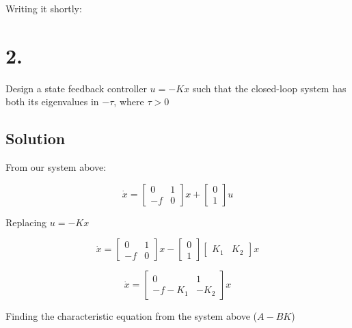 \documentclass[10pt,a4paper]{article}
\begin{document}
Writing it shortly:
\begin{center}
\medskip

\end{center}

\section*{2.}
Design a state feedback controller $u = -Kx$ such that the closed-loop system has both its eigenvalues in $-\tau$, where $\tau > 0$

\subsection*{Solution}
From our system above:

\[
\dot{x} =
\begin{bmatrix}
0 & 1 \\
-f & 0
\end{bmatrix}
x
+
\begin{bmatrix}
0 \\
1
\end{bmatrix}
u
\]

Replacing $u = -Kx$

\[
\dot{x} =
\begin{bmatrix}
0 & 1 \\
-f & 0
\end{bmatrix}
x
-
\begin{bmatrix}
0 \\
1
\end{bmatrix}
\begin{bmatrix}
K_{1} & K_{2}
\end{bmatrix}
x
\]

\[
\dot{x} =
\begin{bmatrix}
0 & 1 \\
-f-K_{1} & -K_{2}
\end{bmatrix}
x \]

Finding the characteristic equation from the system above ($A-BK$)
\end{document}

